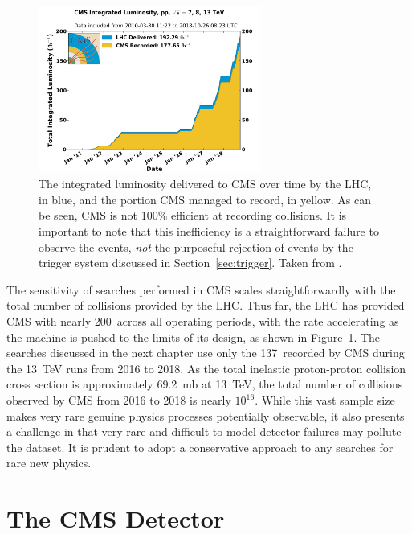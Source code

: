     \begin{figure}[h!]
    \centering
    \includegraphics[width=0.65\textwidth]{figures/int_lumi_allcumulative_pp.pdf}
    \caption[CMS integrated luminosity delivered and recorded over time.]{
      The integrated luminosity delivered to CMS over time by the LHC, in blue, and the portion CMS managed to record, in yellow.
      As can be seen, CMS is not 100\% efficient at recording collisions. 
      It is important to note that this inefficiency is a straightforward failure to observe the events, {\it not} the purposeful rejection of events by the trigger system discussed in Section~\ref{sec:trigger}.
      Taken from \cite{lumipublic}.}
    \label{fig:intlumi}
  \end{figure}  


  The sensitivity of searches performed in CMS scales straightforwardly with the total number of collisions provided by the LHC.
  Thus far, the LHC has provided CMS with nearly 200~\fbinv across all operating periods, with the rate accelerating as the machine is pushed to the limits of its design, as shown in Figure~\ref{fig:intlumi}.
  The searches discussed in the next chapter use only the 137~\fbinv recorded by CMS during the 13~TeV runs from 2016 to 2018.
  As the total inelastic proton-proton collision cross section is approximately 69.2~mb at 13~TeV, the total number of collisions observed by CMS from 2016 to 2018 is nearly $10^{16}$.
  While this vast sample size makes very rare genuine physics processes potentially observable, it also presents a challenge in that very rare and difficult to model detector failures may pollute the dataset.
  It is prudent to adopt a conservative approach to any searches for rare new physics.

\section{The CMS Detector} \label{sec:CMS}

